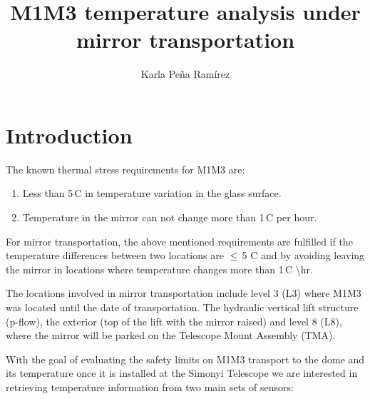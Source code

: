 \documentclass[SE,lsstdraft,authoryear,toc]{lsstdoc}
\title{M1M3 temperature analysis under mirror transportation}
\author{%
Karla Peña Ramírez
}
\date{\vcsDate}
\begin{document}
\mkshorttitle %


\section{Introduction}

The known thermal stress requirements for M1M3 are:
\begin{enumerate}
  \item Less than 5\,\textdegree C in temperature variation in the glass surface.
  \item Temperature in the mirror can not change more than 1\,\textdegree C per hour.
\end{enumerate}

For mirror transportation, the above mentioned requirements are fulfilled if the temperature differences between two locations are $\leq\,$5 \textdegree C and by avoiding leaving the mirror in locations where temperature changes more than 1\,\textdegree C \backslash hr.

The locations involved in mirror transportation include level 3 (L3) where M1M3 was located until the date of transportation. The hydraulic vertical lift structure (p-flow), the exterior (top of the lift with the mirror raised) and level 8 (L8), where the mirror will be parked on the Telescope Mount Assembly (TMA).

With the goal of evaluating the safety limits on M1M3 transport to the dome and its temperature once it is installed at the Simonyi Telescope we are interested in retrieving temperature information from two main sets of sensors:
\end{document}
